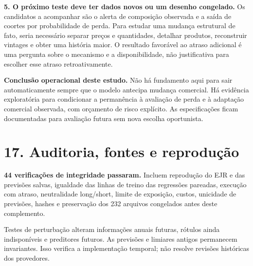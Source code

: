 \documentclass[11pt,a4paper]{article}
\begin{document}
\textbf{5. O próximo teste deve ter dados novos ou um desenho congelado.} Os candidatos a acompanhar são o alerta de composição observada e a saída de coortes por probabilidade de perda. Para estudar uma mudança estrutural de fato, seria necessário separar preços e quantidades, detalhar produtos, reconstruir vintages e obter uma história maior. O resultado favorável ao atraso adicional é uma pergunta sobre o mecanismo e a disponibilidade, não justificativa para escolher esse atraso retroativamente.

\textbf{Conclusão operacional deste estudo.} Não há fundamento aqui para sair automaticamente sempre que o modelo antecipa mudança comercial. Há evidência exploratória para condicionar a permanência à avaliação de perda e à adaptação comercial observada, com orçamento de risco explícito. As especificações ficam documentadas para avaliação futura sem nova escolha oportunista.

\clearpage
\section*{17. Auditoria, fontes e reprodução}
\textbf{44 verificações de integridade passaram.} Incluem reprodução do EJR e das previsões salvas, igualdade das linhas de treino das regressões pareadas, execução com atraso, neutralidade long/short, limite de exposição, custos, unicidade de previsões, hashes e preservação dos 232 arquivos congelados antes deste complemento.

Testes de perturbação alteram informações anuais futuras, rótulos ainda indisponíveis e preditores futuros. As previsões e limiares antigos permanecem invariantes. Isso verifica a implementação temporal; não resolve revisões históricas dos provedores.
\end{document}
